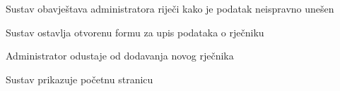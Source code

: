 \begin{packed_item}
\begin{packed_item}
\begin{packed_enum}
								\item Sustav obavještava administratora riječi kako je podatak neispravno unešen
								\item Sustav ostavlja otvorenu formu za upis podataka o rječniku
								
							\end{packed_enum}
							
							\item[4.a] Administrator odustaje od dodavanja novog rječnika
							\item[] \begin{packed_enum}
								
								\item Sustav prikazuje početnu stranicu
								
							\end{packed_enum}
								\end{packed_item}
						\end{packed_item}
					
